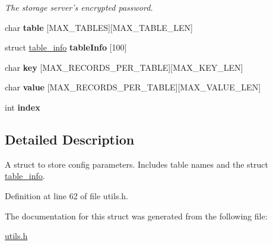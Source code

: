 \begin{DoxyCompactItemize}
\begin{DoxyCompactList}\small\item\em The storage server's encrypted password. \item\end{DoxyCompactList}\item 
\hypertarget{structconfig__params_a1dd93a5eef5bd45ebd0fdd1d7e71cadd}{
char {\bfseries table} \mbox{[}MAX\_\-TABLES\mbox{]}\mbox{[}MAX\_\-TABLE\_\-LEN\mbox{]}}
\label{structconfig__params_a1dd93a5eef5bd45ebd0fdd1d7e71cadd}

\item 
\hypertarget{structconfig__params_a646599603d8196eae196e4dbf7463381}{
struct \hyperlink{structtable__info}{table\_\-info} {\bfseries tableInfo} \mbox{[}100\mbox{]}}
\label{structconfig__params_a646599603d8196eae196e4dbf7463381}

\item 
\hypertarget{structconfig__params_a47fa0ac8b4529cc4d068323414525e23}{
char {\bfseries key} \mbox{[}MAX\_\-RECORDS\_\-PER\_\-TABLE\mbox{]}\mbox{[}MAX\_\-KEY\_\-LEN\mbox{]}}
\label{structconfig__params_a47fa0ac8b4529cc4d068323414525e23}

\item 
\hypertarget{structconfig__params_a32c2d86211e916cc510377659240f68a}{
char {\bfseries value} \mbox{[}MAX\_\-RECORDS\_\-PER\_\-TABLE\mbox{]}\mbox{[}MAX\_\-VALUE\_\-LEN\mbox{]}}
\label{structconfig__params_a32c2d86211e916cc510377659240f68a}

\item 
\hypertarget{structconfig__params_a0cd9ab1c1f6e8f054180b1d442be124b}{
int {\bfseries index}}
\label{structconfig__params_a0cd9ab1c1f6e8f054180b1d442be124b}

\end{DoxyCompactItemize}


\subsection{Detailed Description}
A struct to store config parameters. Includes table names and the struct \hyperlink{structtable__info}{table\_\-info}. 

Definition at line 62 of file utils.h.



The documentation for this struct was generated from the following file:\begin{DoxyCompactItemize}
\item 
\hyperlink{utils_8h}{utils.h}\end{DoxyCompactItemize}

